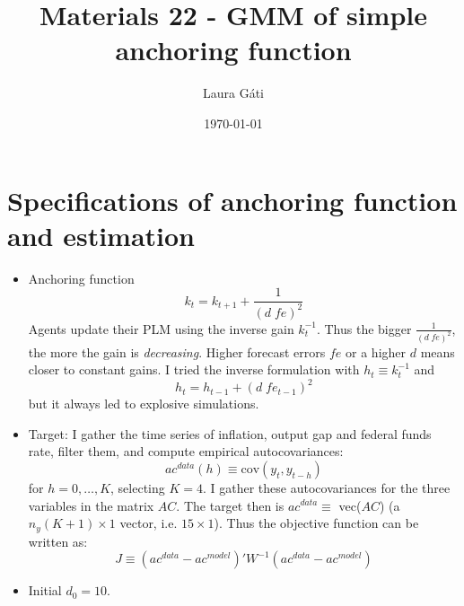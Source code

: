 \documentclass[11pt]{article}
\renewcommand{\[}{\begin{equation}}
\renewcommand{\]}{\end{equation}}
\begin{document}
\linespread{1.0}

\title{Materials 22 - GMM of simple anchoring function}
\author{Laura G\'ati} 
\date{\today}
\maketitle


\tableofcontents


\section{Specifications of anchoring function and estimation}

\begin{itemize}
\item Anchoring function
\begin{equation}
k_t = k_{t+1} + \frac{1}{(d \; fe)^2}
\end{equation}
Agents update their PLM using the inverse gain $k_t^{-1}$. Thus the bigger $ \frac{1}{(d \; fe)^2}$,  the more the gain is \emph{decreasing}. Higher forecast errors $fe$ or a higher $d$ means closer to constant gains. I tried the inverse formulation with $h_t \equiv k_t^{-1}$ and
\begin{equation}
h_t = h_{t-1} + (d \; fe_{t-1})^2
\end{equation}
but it always led to explosive simulations.
\item Target: I gather the time series of inflation, output gap and federal funds rate, filter them, and compute empirical autocovariances:
\begin{equation}
ac^{data}(h) \equiv \text{cov}(y_t, y_{t-h})
\end{equation}
for $h=0,\dots,K$, selecting $K=4$. I gather these autocovariances for the three variables in the matrix $AC$. The target then is $ac^{data} \equiv$ vec($AC$) (a $n_y  (K+1) \times 1$ vector, i.e. $15\times 1$). Thus the objective function can be written as:
\begin{equation}
J \equiv (ac^{data}-ac^{model})' W^{-1} (ac^{data}-ac^{model})
\end{equation}

\item Initial $d_0 = 10$.
\end{itemize}
\end{document}
